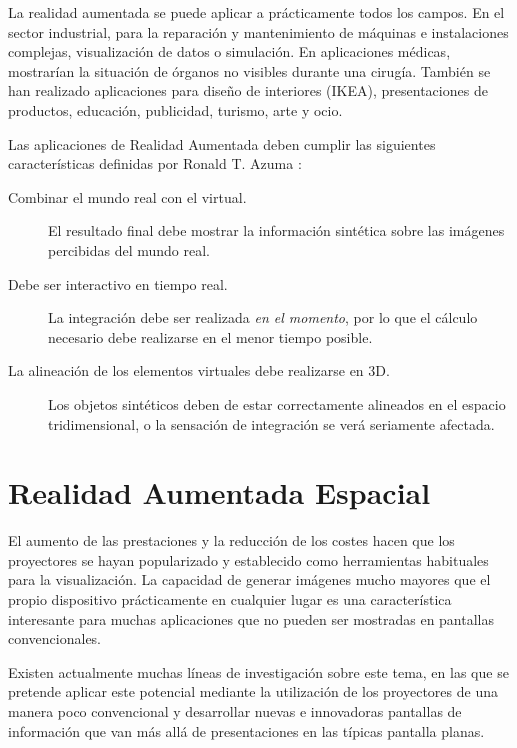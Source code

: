 La realidad aumentada se puede aplicar a prácticamente todos los campos. En el sector industrial, para la reparación y mantenimiento de máquinas e instalaciones complejas, visualización de datos o simulación.  En aplicaciones médicas, mostrarían la situación de órganos no visibles durante una cirugía. También se han realizado aplicaciones para diseño de interiores (IKEA), presentaciones de productos, educación, publicidad, turismo, arte y ocio. 

Las aplicaciones de Realidad Aumentada deben cumplir las siguientes características definidas por Ronald T. Azuma \cite{Azuma}:

\begin{description}
\item[Combinar el mundo real con el virtual.] El resultado final debe mostrar la información sintética sobre las imágenes percibidas del mundo real.
\item[Debe ser interactivo en tiempo real.] La integración debe ser realizada \emph{en el momento}, por lo que el cálculo necesario debe realizarse en el menor tiempo posible.
\item[La alineación de los elementos virtuales debe realizarse en 3D.] Los objetos sintéticos deben de estar correctamente alineados en el espacio tridimensional,  o la sensación de integración se verá seriamente afectada.
\end{description}

\section{Realidad Aumentada Espacial}
El aumento de las prestaciones y la reducción de los costes hacen que los proyectores se hayan popularizado y establecido como herramientas habituales para la visualización. La capacidad de generar imágenes mucho mayores que el propio dispositivo prácticamente en cualquier lugar es una característica interesante para muchas aplicaciones que no pueden ser mostradas en pantallas convencionales. 

Existen actualmente muchas líneas de investigación sobre este tema, en las que se pretende aplicar este potencial mediante la utilización de los proyectores de una manera poco convencional y desarrollar nuevas e innovadoras pantallas de información que van más allá de presentaciones en las típicas pantalla planas.
 
 
